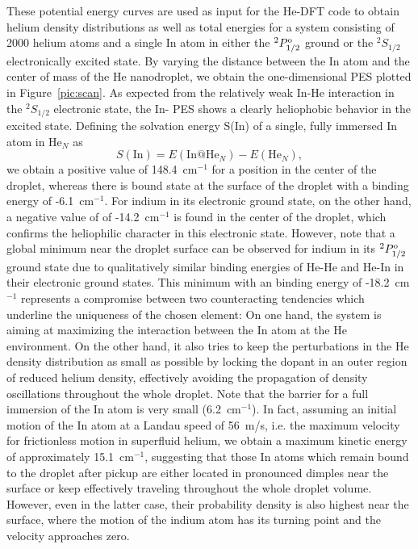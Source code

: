 \documentclass[twoside,twocolumn,9pt]{article}
\begin{document}
These potential energy curves are used as input for the He-DFT code to obtain helium density distributions as well as total energies for a system consisting of 2000 helium atoms and a single In atom in either the $^2P^{\rm o}_{1/2}$ ground or the $^2S_{1/2}$ electronically excited state. By varying the distance between the In atom and the center of mass of the He nanodroplet, we obtain the one-dimensional PES plotted in Figure~\ref{pic:scan}. As expected from the relatively weak In-He interaction in the $^2S_{1/2}$ electronic state, the In- PES shows a clearly heliophobic behavior in the excited state. Defining the solvation energy S(In) of a single, fully immersed In atom in He$_N$ as
\begin{equation}
  \label{eq:solv}
S(\mathrm{In}) = E(\mathrm{In@He}_{N}) - E(\mathrm{He}_{N}),
\end{equation}
we obtain a positive value of 148.4~cm$^{-1}$ for a position in the center of the droplet, whereas there is bound state at the surface of the droplet with a binding energy of -6.1~cm$^{-1}$. For indium in its electronic ground state, on the other hand, a negative value of of -14.2~cm$^{-1}$ is found in the center of the droplet, which confirms the heliophilic character in this electronic state. However, note that a global minimum near the droplet surface can be observed for indium in its $^2P^{\rm o}_{1/2}$  ground state due to qualitatively similar binding energies of He-He and He-In in their electronic ground states. This minimum with an binding energy of -18.2~cm$^{-1}$ represents a compromise between two counteracting tendencies which underline the uniqueness of the chosen element: On one hand, the system is aiming at maximizing the interaction between the In atom at the He environment. On the other hand, it also tries to keep the perturbations in the He density distribution as small as possible by locking the dopant in an outer region of reduced helium density, effectively avoiding the propagation of density oscillations throughout the whole droplet. Note that the barrier for a full immersion of the In atom is very small (6.2~cm$^{-1}$). In fact, assuming an initial motion of the In atom at a Landau speed of 56~m/s, i.e. the maximum velocity for frictionless motion in superfluid helium,  we obtain a maximum kinetic energy of approximately 15.1~cm$^{-1}$, suggesting that those In atoms which remain bound to the droplet after pickup are either located in pronounced dimples near the surface or keep effectively traveling throughout the whole droplet volume. However, even in the latter case, their probability density is also highest near the surface, where the motion of the indium atom has its turning point and the velocity approaches zero.\cite{Hauser:2015cba}
\end{document}
